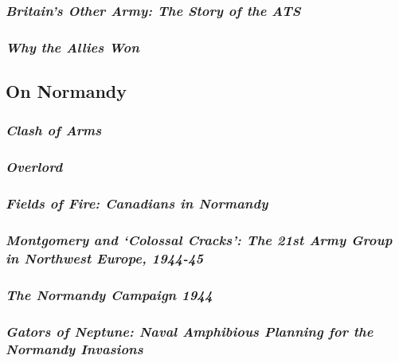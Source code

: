 \documentclass[noraggedright]{turabian-researchpaper}
\begin{document}
		\subsubsection{\textit{Britain's Other Army:  The Story of
			the ATS}}
		\subsubsection{\textit{Why the Allies Won}}

	\subsection{On Normandy}


		\subsubsection{\textit{Clash of Arms}}
		\subsubsection{\textit{Overlord}}
		\subsubsection{\textit{Fields of Fire:  Canadians in 
			Normandy}}

			
		\subsubsection{\textit{Montgomery and `Colossal Cracks':  
			The 21st Army Group in Northwest Europe, 1944-45}}
		\subsubsection{\textit{The Normandy Campaign 1944}}
		\subsubsection{\textit{Gators of Neptune: Naval Amphibious
			Planning for the Normandy Invasions}}
\end{document}
